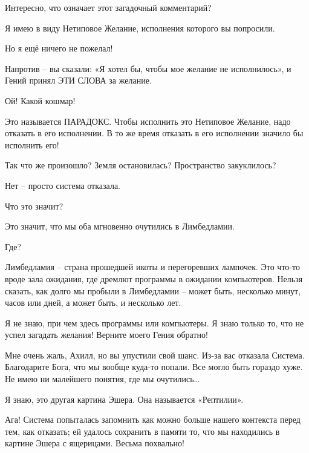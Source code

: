 \documentclass[../main.tex]{subfiles}
\begin{document}
\begin{Dialogue}
\begin{sublevel}
\begin{sublevel}
 Интересно, что означает этот загадочный комментарий?

 Я имею в виду Нетиповое Желание, исполнения которого вы попросили.

 Но я ещё ничего не пожелал!

 Напротив \--- вы сказали: «Я хотел бы, чтобы мое желание не исполнилось», и Гений принял ЭТИ СЛОВА за желание.

 Ой! Какой кошмар!

 Это называется ПАРАДОКС\@. Чтобы исполнить это Нетиповое Желание, надо отказать в его исполнении. В то же время отказать в его исполнении значило бы исполнить его!

 Так что же произошло? Земля остановилась? Пространство закуклилось?

 Нет \--- просто система отказала.

 Что это значит?

 Это значит, что мы оба мгновенно очутились в Лимбедламии.

 Где?

 Лимбедламия \--- страна прошедшей икоты и перегоревших лампочек. Это что-то вроде зала ожидания, где дремлют программы в ожидании компьютеров. Нельзя сказать, как долго мы пробыли в Лимбедламии \--- может быть, несколько минут, часов или дней, а может быть, и несколько лет.

 Я не знаю, при чем здесь программы или компьютеры. Я знаю только то, что не успел загадать желания! Верните моего Гения обратно!

 Мне очень жаль, Ахилл, но вы упустили свой шанс. Из-за вас отказала Система. Благодарите Бога, что мы вообще куда-то попали. Все могло быть гораздо хуже. Не имею ни малейшего понятия, где мы очутились\ldots{}

 Я знаю, это другая картина Эшера. Она называется «Рептилии».

 Ага! Система попыталась запомнить как можно больше нашего контекста перед тем, как отказать; ей удалось сохранить в памяти то, что мы находились в картине Эшера с ящерицами. Весьма похвально!


\end{sublevel}
\end{sublevel}
\end{Dialogue}
\end{document}
